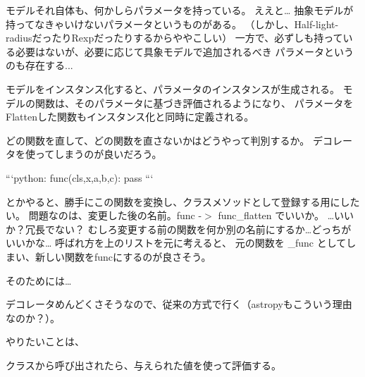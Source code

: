 モデルそれ自体も、何かしらパラメータを持っている。 ええと… 抽象モデルが持ってなきゃいけないパラメータというものがある。 （しかし、\+Half-\/light-\/radiusだったり\+Rexpだったりするからややこしい） 一方で、必ずしも持っている必要はないが、必要に応じて具象モデルで追加されるべき パラメータというのも存在する...

モデルをインスタンス化すると、パラメータのインスタンスが生成される。 モデルの関数は、そのパラメータに基づき評価されるようになり、 パラメータを\+Flattenした関数もインスタンス化と同時に定義される。

どの関数を直して、どの関数を直さないかはどうやって判別するか。 デコレータを使ってしまうのが良いだろう。

```python\+:  func(cls,x,a,b,c)\+: pass ```

とかやると、勝手にこの関数を変換し、クラスメソッドとして登録する用にしたい。 問題なのは、変更した後の名前。func -\/$>$ func\+\_\+flatten でいいか。 …いいか？冗長でない？ むしろ変更する前の関数を何か別の名前にするか…どっちがいいかな… 呼ばれ方を上のリストを元に考えると、 元の関数を {\ttfamily \+\_\+func} としてしまい、新しい関数を{\ttfamily func}にするのが良さそう。

そのためには…

デコレータめんどくさそうなので、従来の方式で行く（astropyもこういう理由なのか？）。

やりたいことは、


\begin{DoxyItemize}
\item クラスから呼び出されたら、与えられた値を使って評価する。
\end{DoxyItemize}

